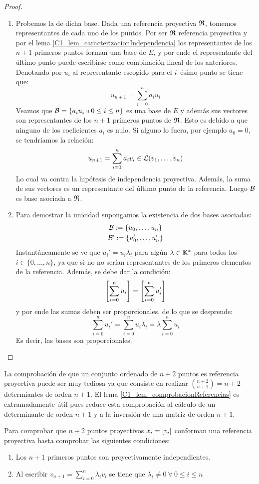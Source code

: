 \begin{proof}
	\begin{enumerate}
		\item Probemos la  de dicha base. Dada una referencia proyectiva $\mathfrak{R}$, tomemos representantes de cada uno de los puntos. Por ser $\mathfrak{R}$ referencia proyectiva y por el lema \ref{C1_lem_caracterizacionIndependencia} los representantes de los $n+1$ primeros puntos forman una base de $E$, y por ende el representante del último punto puede escribirse como combinación lineal de los anteriores. Denotando por $u_i$ al representante escogido para el $i$--ésimo punto se tiene que:
		\[u_{n+1}=\sum_{i=0}^{n}a_iu_i\]
		Veamos que $\mathcal{B}=\{a_iu_i\shortparallel 0\leq i\leq n\}$ es una base de $E$ y además sus vectores son representantes de los $n+1$ primeros puntos de $\mathfrak{R}$. Esto es debido a que ninguno de los coeficientes $a_i$ es nulo. Si alguno lo fuera, por ejemplo $a_0=0$, se tendríamos la relación:
		\[
		u_{n+1}=\sum_{i=1}^{n}a_iv_i\in\mathcal{L}(v_1,\dots,v_n)
		\] Lo cual va contra la hipótesis de independencia proyectiva. Además, la suma de sus vectores es un representante del último punto de la referencia. Luego $\mathcal{B}$ es base asociada a $\mathfrak{R}$.
		\item Para demostrar la unicidad supongamos la existencia de dos bases asociadas:
		\begin{gather*}
			\mathcal{B}:=\{u_0,\dots,u_n\}\\
			\mathcal{B}':=\{u_0',\dots,u_n'\}
		\end{gather*}
		Instantáneamente se ve que $u_i'=u_i\lambda_i$ para algún $\lambda\in\mathbb{K}^*$ para todos los $i\in\{0,\dots,n\}$, ya que si no no serían representantes de los primeros elementos de la referencia. Además, se debe dar la condición:
		\[\left [ \sum_{i=0}^{n}u_i \right ]=\left [ \sum_{i=0}^{n}u_i' \right ]\] y por ende las sumas deben ser proporcionales, de lo que se desprende:
		\[\sum_{i=0}^{n}u_i'=\sum_{i=0}^{n}u_i\lambda_i=\lambda\sum_{i=0}^{n}u_i\]
		Es decir, las bases son proporcionales.
	\end{enumerate}
\end{proof}
La comprobación de que un conjunto ordenado de $n+2$ puntos es referencia proyectiva puede ser muy tediosa ya que consiste en realizar $\binom{n+2}{n+1}=n+2$ determiantes de orden $n+1$. El lema \ref{C1_lem_comprobacionReferencias} es extramadamente útil pues reduce esta comprobación al cálculo de un determinante de orden $n+1$ y a la inversión de una matriz de orden $n+1$.
\begin{lem}
	\label{C1_lem_comprobacionReferencias}
	Para comprobar que $n+2$ puntos proyectivos $x_i=\left [ v_i \right ]$ conforman una referencia proyectiva basta comprobar las siguientes condiciones:\begin{enumerate}
		\item Los $n+1$ primeros puntos son proyectivamente independientes.
		\item Al escribir $v_{n+1}=\sum_{i=0}^{n}\lambda_iv_i$ se tiene que $\lambda_i\not=0\ \forall\ 0\leq i\leq n$
	\end{enumerate}
\end{lem}
